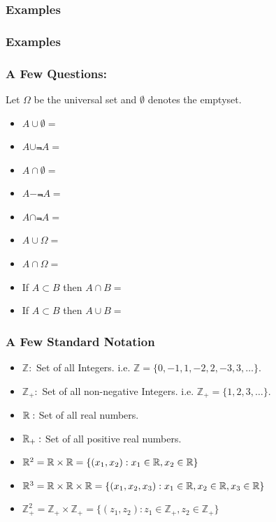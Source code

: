 \documentclass[compress]{beamer}
\begin{document}
\begin{frame}\frametitle{Examples}

\end{frame}

\begin{frame}\frametitle{Examples}

\end{frame}

\begin{frame}\frametitle{A Few Questions:}
Let $\Omega$ be the universal set and $\emptyset$ denotes the emptyset.  
\begin{itemize}
\item  $A \cup \emptyset=$
\item $A \cup \Not{A}=$
\item  $A \cap \emptyset=$
\item $A - \Not{A}=$
\item  $A \cap  \Not{A}=$
\item  $A \cup  \Omega=$
\item  $A \cap  \Omega=$
\item If  $A \subset B$ then $A\cap B=$
\item If  $A \subset B$ then $A\cup B=$
\end{itemize}


\end{frame}




\begin{frame}\frametitle{ A Few Standard Notation}
\begin{itemize}
\item  $\mathbb{Z}:$ Set of all Integers.  i.e. $\mathbb{Z}= \{0, -1, 1, -2, 2, -3, 3, \ldots \}$.
\item  $\mathbb{Z}_{+}:$ Set of all non-negative Integers.  i.e. $\mathbb{Z}_{+}= \{ 1, 2, 3, \ldots \}$.
\item $\mathbb{R}:$ Set of all real numbers.  
\item $\mathbb{R}_+:$ Set of all positive real numbers.  
\end{itemize}

\begin{itemize}
\item $\mathbb{R}^2= \mathbb{R}\times \mathbb{R}=\{(x_1,x_2): x_1\in \mathbb{R}, x_2\in \mathbb{R}\}$
\item $\mathbb{R}^3= \mathbb{R}\times \mathbb{R} \times \mathbb{R}=\{(x_1,x_2, x_3): x_1\in \mathbb{R}, x_2\in \mathbb{R}, x_3\in \mathbb{R}\}$
\item  $\mathbb{Z}_{+}^2=\mathbb{Z}_{+}\times \mathbb{Z}_{+}=\{(z_1,z_2): z_1\in\mathbb{Z}_{+}  , z_2\in \mathbb{Z}_{+}\}$
\end{itemize}
\end{frame}
\end{document}

